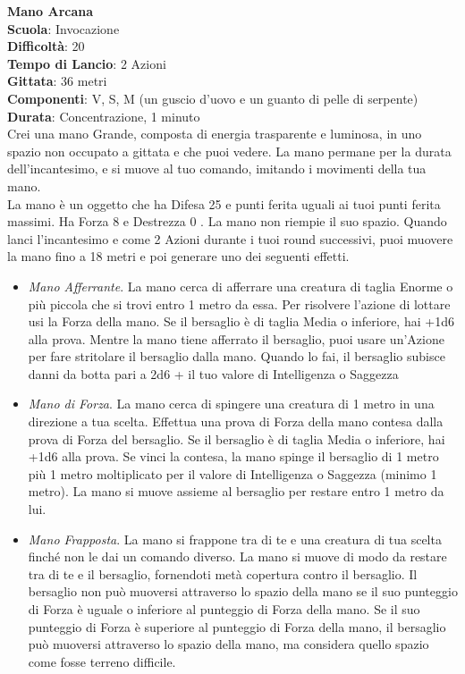\begin{multicols}{2}
\medskip\textbf{Mano Arcana}\\
\textbf{Scuola}: Invocazione\\
\textbf{Difficoltà}: 20\\
\textbf{Tempo di Lancio}: 2 Azioni\\
\textbf{Gittata}: 36 metri\\
\textbf{Componenti}: V, S, M (un guscio d'uovo e un guanto di pelle di serpente)\\
\textbf{Durata}: Concentrazione, 1 minuto\\
Crei una mano Grande, composta di energia trasparente e luminosa, in uno spazio non occupato a gittata e che puoi vedere. La mano permane per la durata dell'incantesimo, e si muove al tuo comando, imitando i movimenti della tua mano.\\
La mano è un oggetto che ha Difesa 25 e punti ferita uguali ai tuoi punti ferita massimi. Ha Forza 8 e Destrezza 0 . La mano non riempie il suo spazio.
Quando lanci l'incantesimo e come 2 Azioni durante i tuoi round successivi, puoi muovere la mano fino a 18 metri e poi generare uno dei seguenti effetti. 
\medskip
\begin{itemize}
\item
\textit{Mano Afferrante}. La mano cerca di afferrare una creatura di taglia Enorme o più piccola che si trovi entro 1 metro da essa. Per risolvere l'azione di lottare usi la Forza della mano. Se il bersaglio è di taglia Media o inferiore, hai +1d6 alla prova. Mentre la mano tiene afferrato il bersaglio, puoi usare un'Azione per fare stritolare il bersaglio dalla mano. Quando lo fai, il bersaglio subisce danni da botta pari a 2d6 + il tuo valore di Intelligenza o Saggezza
\item
\textit{Mano di Forza}. La mano cerca di spingere una creatura di 1 metro in una direzione a tua scelta. Effettua una prova di Forza della mano contesa dalla prova di Forza del bersaglio. Se il bersaglio è di taglia Media o inferiore, hai +1d6 alla prova. Se vinci la contesa, la mano spinge il bersaglio di 1 metro più 1 metro moltiplicato per il valore di Intelligenza o Saggezza (minimo 1 metro). La mano si muove assieme al bersaglio per restare entro 1 metro da lui.\\
\item
\textit{Mano Frapposta}. La mano si frappone tra di te e una creatura di tua scelta finché non le dai un comando diverso. La mano si muove di modo da restare tra di te e il bersaglio, fornendoti metà copertura contro il bersaglio. Il bersaglio non può muoversi attraverso lo spazio della mano se il suo punteggio di Forza è uguale o inferiore al punteggio di Forza della mano. Se il suo punteggio di Forza è superiore al punteggio di Forza della mano, il bersaglio può muoversi attraverso lo spazio della mano, ma considera quello spazio come fosse terreno difficile. \\

\end{itemize}
\end{multicols}
